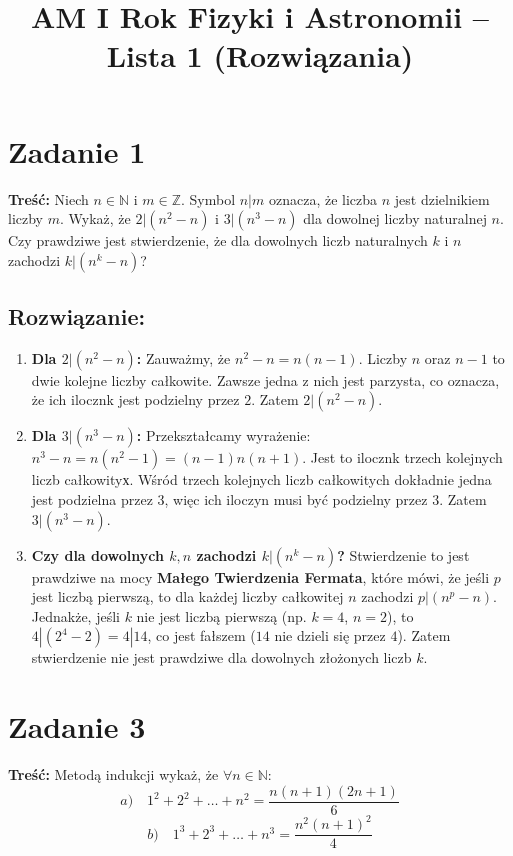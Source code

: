 \documentclass[11pt,a4paper]{article}
\title{AM I Rok Fizyki i Astronomii -- Lista 1 (Rozwiązania)}
\author{}
\date{}
\theoremstyle{definition}
\begin{document}
\maketitle

\section*{Zadanie 1}
\noindent\textbf{Treść:} Niech $n \in \mathbb{N}$ i $m \in \mathbb{Z}$. Symbol $n|m$ oznacza, że liczba $n$ jest dzielnikiem liczby $m$. Wykaż, że $2|(n^2 - n)$ i $3|(n^3 - n)$ dla dowolnej liczby naturalnej $n$. Czy prawdziwe jest stwierdzenie, że dla dowolnych liczb naturalnych $k$ i $n$ zachodzi $k|(n^k - n)$?

\subsection*{Rozwiązanie:}
\begin{enumerate}
    \item \textbf{Dla $2|(n^2 - n)$:}
    Zauważmy, że $n^2 - n = n(n - 1)$. Liczby $n$ oraz $n-1$ to dwie kolejne liczby całkowite. Zawsze jedna z nich jest parzysta, co oznacza, że ich ilocznk jest podzielny przez $2$. Zatem $2|(n^2 - n)$.
    
    \item \textbf{Dla $3|(n^3 - n)$:}
    Przekształcamy wyrażenie: $n^3 - n = n(n^2 - 1) = (n-1)n(n+1)$. Jest to ilocznk trzech kolejnych liczb całkowityх. Wśród trzech kolejnych liczb całkowitych dokładnie jedna jest podzielna przez $3$, więc ich iloczyn musi być podzielny przez $3$. Zatem $3|(n^3 - n)$.
    
    \item \textbf{Czy dla dowolnych $k, n$ zachodzi $k|(n^k - n)$?}
    Stwierdzenie to jest prawdziwe na mocy \textbf{Małego Twierdzenia Fermata}, które mówi, że jeśli $p$ jest liczbą pierwszą, to dla każdej liczby całkowitej $n$ zachodzi $p|(n^p - n)$. Jednakże, jeśli $k$ nie jest liczbą pierwszą (np. $k = 4$, $n = 2$), to $4 | (2^4 - 2) = 4 | 14$, co jest fałszem ($14$ nie dzieli się przez $4$). Zatem stwierdzenie nie jest prawdziwe dla dowolnych złożonych liczb $k$.
\end{enumerate}

\section*{Zadanie 3}
\noindent\textbf{Treść:} Metodą indukcji wykaż, że $\forall n \in \mathbb{N}$:
\[ a) \quad 1^2 + 2^2 + \ldots + n^2 = \frac{n(n+1)(2n+1)}{6} \]
\[ b) \quad 1^3 + 2^3 + \ldots + n^3 = \frac{n^2(n+1)^2}{4} \]
\end{document}
